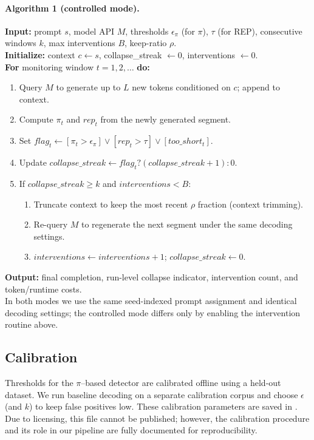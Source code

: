 \documentclass{article}
\begin{document}
\paragraph{Algorithm 1 (controlled mode).}
\textbf{Input:} prompt $s$, model API $M$, thresholds $\epsilon_{\pi}$ (for $\pi$), $\tau$ (for REP), consecutive windows $k$, max interventions $B$, keep-ratio $\rho$.\\
\textbf{Initialize:} context $c \leftarrow s$, collapse\_streak $\leftarrow 0$, interventions $\leftarrow 0$.\\
\textbf{For} monitoring window $t=1,2,\dots$ \textbf{do:}
\begin{enumerate}
  \item Query $M$ to generate up to $L$ new tokens conditioned on $c$; append to context.
  \item Compute $\pi_t$ and $rep_t$ from the newly generated segment.
  \item Set $flag_t \leftarrow [\pi_t>\epsilon_{\pi}] \lor [rep_t>\tau] \lor [too\_short_t]$.
  \item Update $collapse\_streak \leftarrow flag_t ? (collapse\_streak+1) : 0$.
  \item If $collapse\_streak \ge k$ and $interventions < B$:
  \begin{enumerate}
    \item Truncate context to keep the most recent $\rho$ fraction (context trimming).
    \item Re-query $M$ to regenerate the next segment under the same decoding settings.
    \item $interventions \leftarrow interventions +1$; $collapse\_streak \leftarrow 0$.
  \end{enumerate}
\end{enumerate}
\textbf{Output:} final completion, run-level collapse indicator, intervention count, and token/runtime costs.\\
In both modes we use the same seed-indexed prompt assignment and identical decoding settings; the controlled mode differs only by enabling the intervention routine above.

\subsection{Calibration}
\label{sec:calibration}
Thresholds for the $\pi$--based detector are calibrated offline using a held-out dataset. We run baseline decoding on a separate calibration corpus and choose $\epsilon$ (and $k$) to keep false positives low. These calibration parameters are saved in . Due to licensing, this file cannot be published; however, the calibration procedure and its role in our pipeline are fully documented for reproducibility.
\end{document}
